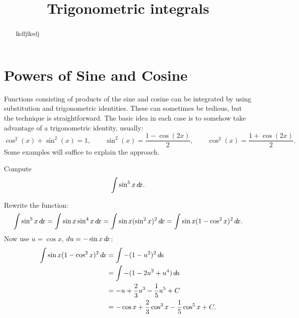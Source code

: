 \documentclass{ximera}
\title[Dig-In:]{Trigonometric integrals}
\begin{document}
\begin{abstract}
  lkdfjlksdj
\end{abstract}
\maketitle

\section{Powers of Sine and Cosine}


Functions consisting of products of the sine and cosine can be
integrated by using substitution and trigonometric identities. These
can sometimes be tedious, but the technique is straightforward. The
basic idea in each case is to somehow take advantage of a
trigonometric identity, usually:
\[
\cos^2(x) + \sin^2(x) = 1, \qquad \sin^2(x) = \frac{1-\cos(2x)}{2}, \qquad \cos^2(x)= \frac{1+\cos(2x)}{2}.
\]
Some examples will suffice to explain the approach.

\begin{example}
Compute
\[\int \sin^5 x\mathop{}\!d\! x.
\]
\begin{explanation}
Rewrite the function:
\[
  \int \sin^5 x\d x=\int \sin x \sin^4 x\d x=
  \int \sin x (\sin^2 x)^2\d x=
  \int \sin x (1-\cos^2 x)^2\d x.
\]
Now use $u=\cos x$, $du=-\sin x\mathop{}\!d\! x$:
\begin{align*}
  \int \sin x (1-\cos^2 x)^2\mathop{}\!d\! x&=\int -(1-u^2)^2\mathop{}\!d\! u \\
  &=\int -(1-2u^2+u^4)\mathop{}\!d\! u \\
  &=-u+{2\over3}u^3-{1\over5}u^5+C \\
  &=-\cos x+{2\over3}\cos^3 x-{1\over5}\cos^5x+C. 
\end{align*}
\end{explanation}
\end{example}
\end{document}
